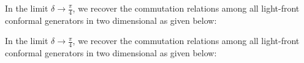 \documentclass[]{article}
\numberwithin{equation}{section}
\begin{document}
{{\pagebreak
 In the limit $\delta\longrightarrow\frac{\pi}{4}$, we recover the commutation relations among all light-front conformal generators in two dimensional as given below:

\begin{table}[h!]
\centering
\caption{\label{tabelinterpolationifd}$1+1$ conformal algebra in IFD}
\end{table}


 In the limit $\delta\longrightarrow\frac{\pi}{4}$, we recover the commutation relations among all light-front conformal generators in two dimensional as given below:


}}
\end{document}
